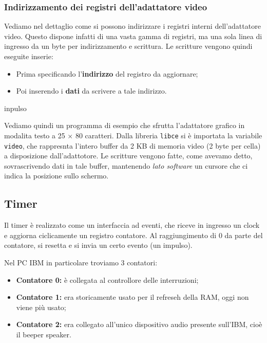 \documentclass[a4paper,11pt]{article}
\begin{document}
\subsubsection{Indirizzamento dei registri dell'adattatore video}
Vediamo nel dettaglio come si possono indirizzare i registri interni dell'adattatore video.
Questo dispone infatti di una vasta gamma di registri, ma una sola linea di ingresso da un byte per indirizzamento e scrittura.
Le scritture vengono quindi eseguite inserie:
\begin{itemize}
	\item Prima specificando l'\textbf{indirizzo} del registro da aggiornare;
	\item Poi inserendo i \textbf{dati} da scrivere a tale indirizzo.
\end{itemize}inpulso

\par\smallskip

Vediamo quindi un programma di esempio che sfrutta l'adattatore grafico in modalita testo a 25 $\times$ 80 caratteri.
Dalla libreria \lstinline|libce| si è importata la variabile \lstinline|video|, che rappresnta l'intero buffer da 2 KB di memoria video (2 byte per cella) a disposizione dall'adattotore.
Le scritture vengono fatte, come avevamo detto, sovrascrivendo dati in tale buffer, mantenendo \textit{lato software} un cursore che ci indica la posizione sullo schermo.

\lstset{style=codestyle, language=c++}


\subsection{Timer}
Il timer è realizzato come un interfaccia ad eventi, che riceve in ingresso un clock e aggiorna ciclicamente un registro contatore.
Al raggiungimento di 0 da parte del contatore, si resetta e si invia un certo evento (un impulso).

Nel PC IBM in particolare troviamo 3 contatori:
\begin{itemize}
	\item \textbf{Contatore 0:} è collegata al controllore delle interruzioni;
	\item \textbf{Contatore 1:} era storicamente usato per il refreseh della RAM, oggi non viene più usato;
	\item \textbf{Contatore 2:} era collegato all'unico dispositivo audio presente sull'IBM, cioè il beeper speaker.
\end{itemize}
\end{document}
